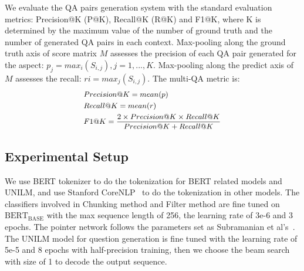 We evaluate the QA pairs generation system with the standard evaluation metrics: Precision@K (P@K), Recall@K (R@K) and F1@K, where K is determined by 
the maximum value of the number of ground truth and the number of  generated QA pairs in each context.
Max-pooling along the ground truth axis of score matrix $M$ assesses the precision of each QA pair generated for the aspect:
$p_j=max_i(S_{i,j}), j=1,...,K$.
Max-pooling along the predict axis of $M$ assesses the recall:  
$ri = max_j (S_{i,j})$.
The multi-QA metric is:
\begin{equation*}
\small
\begin{split}
&Precision@K=mean(p)\\
&Recall@K=mean(r)\\
&F1@K = \frac{2\times Precision@K\times Recall@K}{Precision@K + Recall@K}
\end{split}
\end{equation*}

\subsection{Experimental Setup}
We use BERT tokenizer to do the tokenization for BERT related models and UNILM, and use Stanford CoreNLP~\cite{manning-EtAl:2014:P14-5} to do the tokenization in other models.
The classifiers involved in Chunking method and Filter method are fine tuned on $\text{BERT}_{\text{BASE}}$ with the max sequence length of 256, the learning rate of 3e-6 and 3 epochs.
The pointer network follows the parameters set as Subramanian et al's~.
The UNILM model for question generation is fine tuned with the learning rate of 5e-5 and 8 epochs with half-precision training, then we choose the beam search with size of 1 to decode the output sequence.


